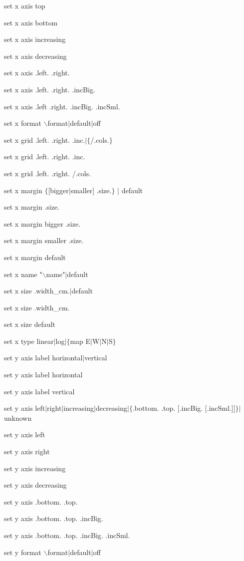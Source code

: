 set x axis top

set x axis bottom

set x axis increasing

set x axis decreasing

set x axis .left. .right.

set x axis .left. .right. .incBig.

set x axis .left .right. .incBig. .incSml.

set x format $\backslash$format$\mid$default$\mid$off


set x grid .left. .right. .inc.$\mid$$\lbrace$/.cols.$\rbrace$

set x grid .left. .right. .inc.

set x grid .left. .right. /.cols.

set x margin $\lbrace$[bigger$\mid$smaller] .size.$\rbrace$ $\mid$ default

set x margin .size.

set x margin bigger .size.

set x margin smaller .size.

set x margin default

set x name "$\backslash$name"$\mid$default

set x size .width\_cm.$\mid$default

set x size .width\_cm.

set x size default

set x type linear$\mid$log$\mid$$\lbrace$map E$\mid$W$\mid$N$\mid$S$\rbrace$

set y axis label horizontal$\mid$vertical

set y axis label horizontal

set y axis label vertical

set y axis left$\mid$right$\mid$increasing$\mid$decreasing$\mid$$\lbrace$.bottom. .top. [.incBig. [.incSml.]]$\rbrace$$\mid$unknown

set y axis left

set y axis right

set y axis increasing

set y axis decreasing

set y axis .bottom. .top.

set y axis .bottom. .top. .incBig.

set y axis .bottom. .top. .incBig. .incSml.

set y format $\backslash$format$\mid$default$\mid$off

